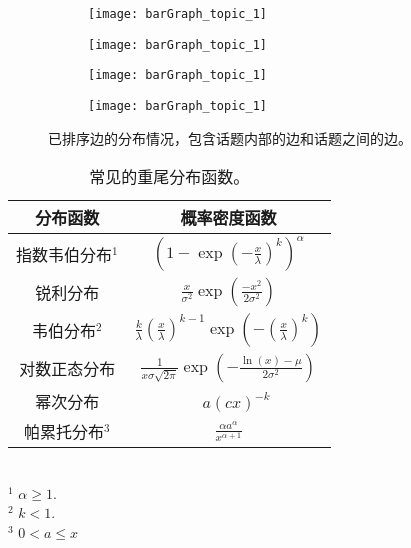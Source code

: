 \begin{figure}[!htbp]
    \centering
    \begin{subfigure}[b]{0.24\textwidth}
      \texttt{[image: barGraph\_topic\_1]}
      \caption{}
      \label{fig:barGraph_t1}
    \end{subfigure}%
    \begin{subfigure}[b]{0.24\textwidth}
      \texttt{[image: barGraph\_topic\_1]}
      \caption{}
      \label{fig:barGraph_t2}
    \end{subfigure}
    \begin{subfigure}[b]{0.24\textwidth}
      \texttt{[image: barGraph\_topic\_1]}
      \caption{}
      \label{fig:barGraph_t3}
    \end{subfigure}%
    \begin{subfigure}[b]{0.24\textwidth}
      \texttt{[image: barGraph\_topic\_1]}
      \caption{}
      \label{fig:barGraph_t4}
    \end{subfigure}
    \caption{已排序边的分布情况，包含话题内部的边和话题之间的边。}
    \label{fig:barGraph}
\end{figure}

\begin{table}[!htbp]
    \caption{常见的重尾分布函数。}
    \label{tab:PDF}
    \centering
    \setlength{\tabcolsep}{4pt}%
    \renewcommand{\arraystretch}{1.2}%
    \begin{tabular}{|c|c|}
        \hline
        分布函数 & 概率密度函数\\
        \hline\hline
        指数韦伯分布$^1$ & $(1-\exp(-\frac{x}{\lambda})^k)^{\alpha}$\\
        \hline
        锐利分布 & $\frac{x}{\sigma^2}\exp(\frac{-x^2}{2\sigma^2})$\\
        \hline
        韦伯分布$^2$ & $\frac{k}{\lambda}(\frac{x}{\lambda})^{k-1}\exp(-(\frac{x}{\lambda})^k)$\\
        \hline
        对数正态分布 & $\frac{1}{x\sigma\sqrt{2\pi}}\exp(-\frac{\ln(x)-\mu}{2\sigma^2})$\\
        \hline
        幂次分布　&　$a(cx)^{-k}$\\
        \hline
        帕累托分布$^3$　& $\frac{\alpha a^{\alpha}}{x^{\alpha+1}}$\\
        \hline
    \end{tabular}\\
    \footnotesize{$^1$ $\alpha \geq 1.$}\\
    \footnotesize{$^2$ $k < 1.$}\\
    \footnotesize{$^3$ $0 < a \leq x$}\\
\end{table}

